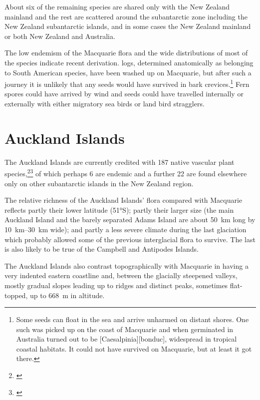 About six of the remaining species are shared only with the New Zealand mainland and the rest are scattered around the subantarctic zone including the New Zealand subantarctic islands, and in some cases the New Zealand mainland or both New Zealand and Australia.

The low endemism of the Macquarie flora and the wide distributions of most of the species indicate recent derivation.
 logs, determined anatomically as belonging to South American species, have been washed up on Macquarie, but after such a journey it is unlikely that any seeds would have survived in bark crevices.\footnote{Some seeds can float in the sea and arrive unharmed on distant shores. One such was picked up on the coast of Macquarie and when germinated in Australia turned out to be [Caesalpinia][bonduc], widespread in tropical coastal habitats. It could not have survived on Macquarie, but at least it got there.}
Fern spores could have arrived by wind and seeds could have travelled internally or externally with either migratory sea birds or land bird stragglers.

\section{Auckland Islands}

The Auckland Islands are currently credited with 187 native vascular plant species,\footnote{\cite{meurk1982supplementary}}\footnote{\cite{johnson1975vascular}} of which perhaps 6 are endemic and a further 22 are found elsewhere only on other subantarctic islands in the New Zealand region.

The relative richness of the Auckland Islands' flora compared with Macquarie reflects partly their lower latitude (\ang{51}S); partly their larger size (the main Auckland Island and the barely separated Adams Island are about \SI{50}{\kilo\metre} long by \SIrange{10}{30}{\kilo\metre} wide); and partly a less severe climate during the last glaciation which probably allowed some of the previous interglacial flora to survive.
The last is also likely to be true of the Campbell and Antipodes Islands.

The Auckland Islands also contrast topographically with Macquarie in having a very indented eastern coastline and, between the glacially steepened valleys, mostly gradual slopes leading up to ridges and distinct peaks, sometimes flat-topped, up to \SI{668}{\metre} in altitude.

